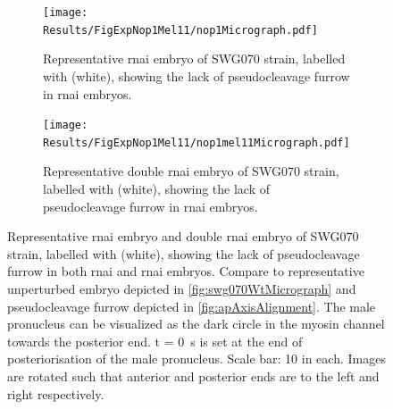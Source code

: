\begin{figure}
\centering
\begin{subfigure}{\textwidth}
    \centering
    \texttt{[image: Results/FigExpNop1Mel11/nop1Micrograph.pdf]}
    \caption{Representative  \ac{rnai} embryo of SWG070 strain, labelled with  (white), showing the lack of pseudocleavage furrow in  \ac{rnai} embryos.}
    \label{subfig:swg070Nop1AndNop1Mel11Micrograph-nop1}
\end{subfigure}
\hfill
\begin{subfigure}{\textwidth}
    \centering
    \texttt{[image: Results/FigExpNop1Mel11/nop1mel11Micrograph.pdf]}
    \caption{Representative  double \ac{rnai} embryo of SWG070 strain, labelled with  (white), showing the lack of pseudocleavage furrow in  \ac{rnai} embryos.}
    \label{subfig:swg070Nop1AndNop1Mel11Micrograph-nop1mel11}
\end{subfigure}
\caption[Representative micrograph:  \acs{rnai} and  double \acs{rnai} embryos]{Representative  \ac{rnai} embryo and  double \ac{rnai} embryo of SWG070 strain, labelled with  (white), showing the lack of pseudocleavage furrow in both  \ac{rnai} and  \ac{rnai} embryos. Compare to representative unperturbed embryo depicted in \autoref{fig:swg070WtMicrograph} and pseudocleavage furrow depicted in \autoref{fig:apAxisAlignment}. The male pronucleus can be visualized as the dark circle in the myosin channel towards the posterior end. t = \SI{0}{\second} is set at the end of posteriorisation of the male pronucleus. Scale bar: \SI{10}{\unitLength} in each. Images are rotated such that anterior and posterior ends are to the left and right respectively.}
\label{fig:swg070Nop1AndNop1Mel11Micrograph}
\end{figure}

